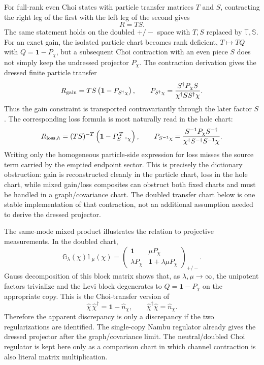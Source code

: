 \documentclass[aps,prb,onecolumn,nofootinbib,superscriptaddress]{revtex4-2}
\newcommand{\I}{\mathbf{1}}
\theoremstyle{plain}
\theoremstyle{definition}
\begin{document}
For full-rank even Choi states with particle transfer matrices \(T\) and
\(S\), contracting the right leg of the first with the left leg of the second
gives
\begin{equation}
  R=TS .
  \label{eq:choi-contraction-product}
\end{equation}
The same statement holds on the doubled \(+/-\) space with
\(T,S\) replaced by \(\mathbb T,\mathbb S\).  For an exact gain, the isolated
particle chart becomes rank deficient, \(T\mapsto TQ\) with
\(Q=\I-P_\chi\), but a subsequent Choi contraction with an even piece \(S\)
does not simply keep the undressed projector \(P_\chi\).  The contraction
derivation gives the dressed finite particle transfer
\begin{equation}
  R_{\rm gain}
  =
  TS\left(\I-P_{S^\dagger\chi}\right),
  \qquad
  P_{S^\dagger\chi}
  =
  \frac{S^\dagger P_\chi S}
       {\chi^\dagger SS^\dagger\chi}.
  \label{eq:choi-gain-dressed-projector}
\end{equation}
Thus the gain constraint is transported contravariantly through the later
factor \(S\).  The corresponding loss formula is most naturally read in the
hole chart:
\begin{equation}
  R_{{\rm loss},h}
  =
  (TS)^{-T}\left(\I-P_{S^{-1}\chi}^{\,T}\right),
  \qquad
  P_{S^{-1}\chi}
  =
  \frac{S^{-1}P_\chi S^{-\dagger}}
       {\chi^\dagger S^{-\dagger}S^{-1}\chi}.
  \label{eq:choi-loss-dressed-projector}
\end{equation}
Writing only the homogeneous particle-side expression for loss misses the
source term carried by the emptied endpoint sector.  This is precisely the
dictionary obstruction: gain is reconstructed cleanly in the particle chart,
loss in the hole chart, while mixed gain/loss composites can obstruct both
fixed charts and must be handled in a graph/covariance chart.  The doubled
transfer chart below is one stable implementation of that contraction, not an
additional assumption needed to derive the dressed projector.

The same-mode mixed product illustrates the relation to projective
measurements.  In the doubled chart,
\begin{equation}
  \mathbb G_\lambda(\chi)\mathbb L_\mu(\chi)
  =
  \begin{pmatrix}
    \I & \mu P_\chi\\
    \lambda P_\chi & \I+\lambda\mu P_\chi
  \end{pmatrix}_{+/-}.
  \label{eq:doubled-gain-loss-product}
\end{equation}
Gauss decomposition of this block matrix shows that, as
\(\lambda,\mu\to\infty\), the unipotent factors trivialize and the Levi block
degenerates to \(Q=\I-P_\chi\) on the appropriate copy.  This is the
Choi-transfer version of
\[
  \hat\chi\,\hat\chi^\dagger=\I-\hat n_\chi,
  \qquad
  \hat\chi^\dagger\hat\chi=\hat n_\chi .
\]
Therefore the apparent discrepancy is only a discrepancy if the two
regularizations are identified.  The single-copy Nambu regulator already
gives the dressed projector after the graph/covariance limit.  The
neutral/doubled Choi regulator is kept here only as a comparison chart in
which channel contraction is also literal matrix multiplication.
\end{document}
